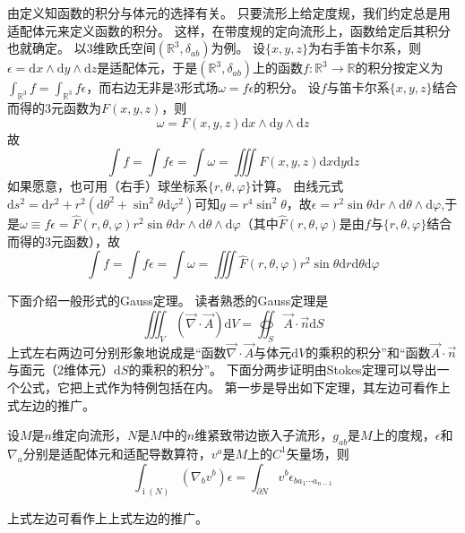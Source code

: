 由定义知函数的积分与体元的选择有关。
只要流形上给定度规，我们约定总是用适配体元来定义函数的积分。
这样，在带度规的定向流形上，函数给定后其积分也就确定。
以$3$维欧氏空间$(\mathbb{R}^3, \delta_{ab})$为例。
设$\{x, y, z\}$为右手笛卡尔系，则$\epsilon = \mathrm{d}x \wedge \mathrm{d}y \wedge \mathrm{d}z$是适配体元，于是$(\mathbb{R}^3, \delta_{ab})$上的函数$f \colon \mathbb{R}^3 \to \mathbb{R}$的积分按定义为$\displaystyle\int_{\mathbb{R}^3}f = \int_{\mathbb{R}^3}f\epsilon$，而右边无非是$3$形式场$\omega = f\epsilon$的积分。
设$f$与笛卡尔系$\{x, y, z\}$结合而得的$3$元函数为$F(x, y, z)$，则
$$\omega = F(x, y, z)\mathrm{d}x\wedge\mathrm{d}y\wedge\mathrm{d}z$$
故
$$\int f = \int f\epsilon = \int \omega = \iiint F(x, y, z) \mathrm{d}x\mathrm{d}y\mathrm{d}z$$
如果愿意，也可用（右手）球坐标系$\{r, \theta, \varphi\}$计算。
由线元式$\mathrm{d}s^2 = \mathrm{d}r^2 + r^2(\mathrm{d}\theta^2 + \sin^2\theta\mathrm{d}\varphi^2)$可知$g = r^4\sin^2\theta$，故$\epsilon = r^2\sin\theta\mathrm{d}r\wedge\mathrm{d}\theta\wedge\mathrm{d}\varphi$,于是$\omega \equiv f\epsilon = \hat{F}(r, \theta, \varphi)r^2\sin\theta\mathrm{d}r \wedge\mathrm{d}\theta\wedge\mathrm{d}\varphi$（其中$\hat{F}(r, \theta, \varphi)$是由$f$与$\{r, \theta, \varphi\}$结合而得的$3$元函数），故
$$\int f = \int f\epsilon = \int\omega = \iiint\hat{F}(r, \theta, \varphi)r^2\sin\theta\mathrm{d}r\mathrm{d}\theta\mathrm{d}\varphi$$

下面介绍一般形式的Gauss定理。
读者熟悉的Gauss定理是
$$\iiint_V (\vec{\nabla}\cdot\vec{A})\mathrm{d}V = \oiint_S\vec{A}\cdot\vec{n}\mathrm{d}S$$
上式左右两边可分别形象地说成是``函数$\vec\nabla \cdot \vec A$与体元$\mathrm{d}V$的乘积的积分''和``函数$\vec A \cdot \vec n$与面元（$2$维体元）$\mathrm{d}S$的乘积的积分''。
下面分两步证明由Stokes定理可以导出一个公式，它把上式作为特例包括在内。
第一步是导出如下定理，其左边可看作上式左边的推广。

\begin{theorem}
    设$M$是$n$维定向流形，$N$是$M$中的$n$维紧致带边嵌入子流形，$g_{ab}$是$M$上的度规，$\epsilon$和$\nabla_a$分别是适配体元和适配导数算符，$v^a$是$M$上的$C^1$矢量场，则
    $$\int_{\operatorname{i}(N)}(\nabla_bv^b)\epsilon = \int_{\partial N}v^b\epsilon_{b a_1 \cdots a_{n - 1}}$$
\end{theorem}

\begin{note}
    上式左边可看作上上式左边的推广。
\end{note}

